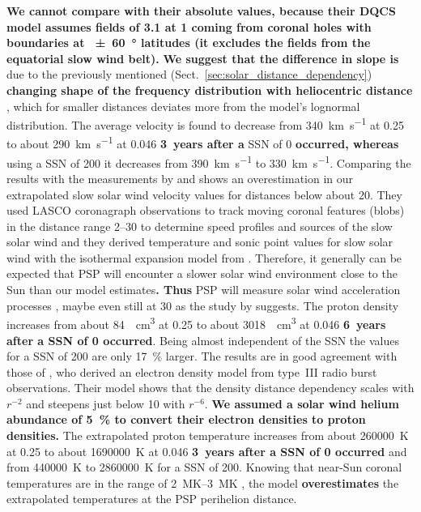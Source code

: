\textbf{We cannot compare with their absolute values, because their DQCS model assumes fields of \SI{3.1}{\nT} at \SI{1}{\au} coming from coronal holes with boundaries at \SI{+-60}{\degree} latitudes (it excludes the fields from the equatorial slow wind belt).}
\textbf{We suggest that the difference in slope is} due to the previously mentioned (Sect.~\ref{sec:solar_distance_dependency}) \textbf{changing shape of the frequency distribution with heliocentric distance} , which for smaller distances deviates more from the model’s lognormal distribution.
The average velocity is found to decrease from \SI{340}{\km\per\s} at \SI{0.25}{\au} to about \SI{290}{\km\per\s} at \SI{0.046}{\au} \textbf{3~years after a} SSN of 0 \textbf{occurred, whereas} using a SSN of 200 it decreases from \SI{390}{\km\per\s} to \SI{330}{\km\per\s}. Comparing the results with the measurements by \citet{Sheeley1997} and \citet{Wang2000} shows an overestimation in our extrapolated slow solar wind velocity values for distances below about \SI{20}{\Rs}. They used LASCO coronagraph observations to track moving coronal features (blobs) in the distance range \SIrange{2}{30}{\Rs} to determine speed profiles and sources of the slow solar wind and they derived temperature and sonic point values for slow solar wind with the isothermal expansion model from \citet{Parker1958}. Therefore, it generally can be expected that PSP will encounter a slower solar wind environment close to the Sun than our model estimates\textbf{. Thus} PSP will measure solar wind acceleration processes \citep{McComas2008}, maybe even still at \SI{30}{\Rs} as the study by \citet{Sheeley1997} suggests.
The proton density increases from about \SI{84}{\per\cm\cubed} at \SI{0.25}{\au} to about \SI{3018}{\per\cm\cubed} at \SI{0.046}{\au} \textbf{6~years after a SSN of 0 occurred}. Being almost independent of the SSN the values for a SSN of 200 are only \SI{17}{\%} larger. The results are in good agreement with those of \citet{Leblanc1998}, who derived an electron density model from type~III radio burst observations. Their model shows that the density distance dependency scales with $r^{-2}$ and steepens just below \SI{10}{\Rs} with $r^{-6}$. \textbf{We assumed a solar wind helium abundance of \SI{5}{\%} to convert their electron densities to proton densities.}
The extrapolated proton temperature increases from about \SI{260000}{\K} at \SI{0.25}{\au} to about \SI{1690000}{\K} at \SI{0.046}{\au} \textbf{3~years after a SSN of 0 occurred} and from \SI{440000}{\K} to \SI{2860000}{\K} for a SSN of 200. Knowing that near-Sun coronal temperatures are in the range of \SIrange{2}{3}{\mega\K} \citep{Billings1959,Liebenberg1975}, the model \textbf{overestimates} the extrapolated temperatures at the PSP perihelion distance.


